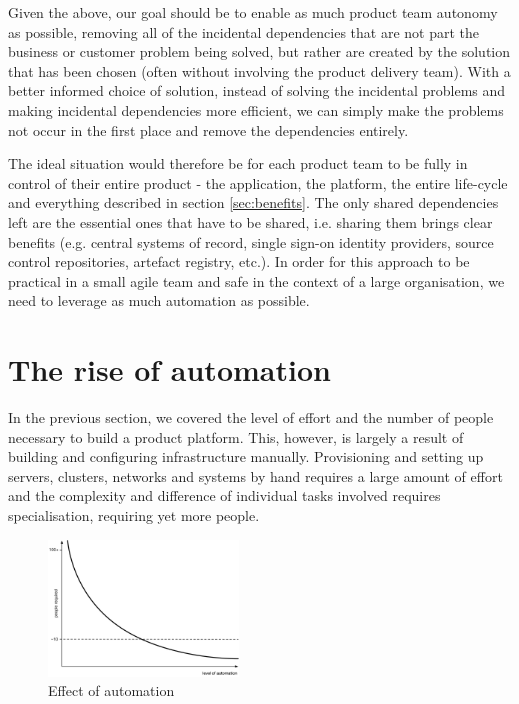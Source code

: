 \documentclass[reprint,amsmath,amssymb,aps]{revtex4-1}
\begin{document}
Given the above, our goal should be to enable as much product team autonomy as possible, removing all of the incidental dependencies that are not part the business or customer problem being solved, but rather are created by the solution that has been chosen (often without involving the product delivery team). With a better informed choice of solution, instead of solving the incidental problems and making incidental dependencies more efficient, we can simply make the problems not occur in the first place and remove the dependencies entirely.

The ideal situation would therefore be for each product team to be fully in control of their entire product - the application, the platform, the entire life-cycle and everything described in section \ref{sec:benefits}. The only shared dependencies left are the essential ones that have to be shared, i.e. sharing them brings clear benefits (e.g. central systems of record, single sign-on identity providers, source control repositories, artefact registry, etc.). In order for this approach to be practical in a small agile team and safe in the context of a large organisation, we need to leverage as much automation as possible.


\section{The rise of automation}
\label{sec:automation}

In the previous section, we covered the level of effort and the number of people necessary to build a product platform. This, however, is largely a result of building and configuring infrastructure manually. Provisioning and setting up servers, clusters, networks and systems by hand requires a large amount of effort and the complexity and difference of individual tasks involved requires specialisation, requiring yet more people.

\begin{figure}[h]
	\includegraphics[width=0.45\textwidth]{figs/automation}
	\caption{Effect of automation}
	\label{fig:automationn}
\end{figure}
\end{document}
